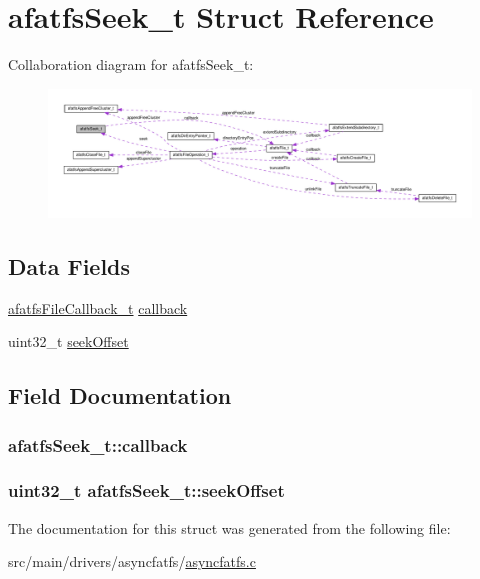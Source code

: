 \hypertarget{structafatfsSeek__t}{\section{afatfs\+Seek\+\_\+t Struct Reference}
\label{structafatfsSeek__t}
}


Collaboration diagram for afatfs\+Seek\+\_\+t\+:\nopagebreak
\begin{figure}[H]
\begin{center}
\leavevmode
\includegraphics[width=350pt]{structafatfsSeek__t__coll__graph}
\end{center}
\end{figure}
\subsection*{Data Fields}
\begin{DoxyCompactItemize}
\item 
\hyperlink{asyncfatfs_8h_aaa910b9db73f482a20cfa5a7f3970e7f}{afatfs\+File\+Callback\+\_\+t} \hyperlink{structafatfsSeek__t_ac1ba3f4dd3b4d4200268aeb20fff8b2f}{callback}
\item 
uint32\+\_\+t \hyperlink{structafatfsSeek__t_a08ac27962441fa641eb5ecf8eef132cd}{seek\+Offset}
\end{DoxyCompactItemize}


\subsection{Field Documentation}
\hypertarget{structafatfsSeek__t_ac1ba3f4dd3b4d4200268aeb20fff8b2f}{
\subsubsection[{callback}]{ afatfs\+Seek\+\_\+t\+::callback}}\label{structafatfsSeek__t_ac1ba3f4dd3b4d4200268aeb20fff8b2f}
\hypertarget{structafatfsSeek__t_a08ac27962441fa641eb5ecf8eef132cd}{
\subsubsection[{seek\+Offset}]{\setlength{\rightskip}{0pt plus 5cm}uint32\+\_\+t afatfs\+Seek\+\_\+t\+::seek\+Offset}}\label{structafatfsSeek__t_a08ac27962441fa641eb5ecf8eef132cd}


The documentation for this struct was generated from the following file\+:\begin{DoxyCompactItemize}
\item 
src/main/drivers/asyncfatfs/\hyperlink{asyncfatfs_8c}{asyncfatfs.\+c}\end{DoxyCompactItemize}
